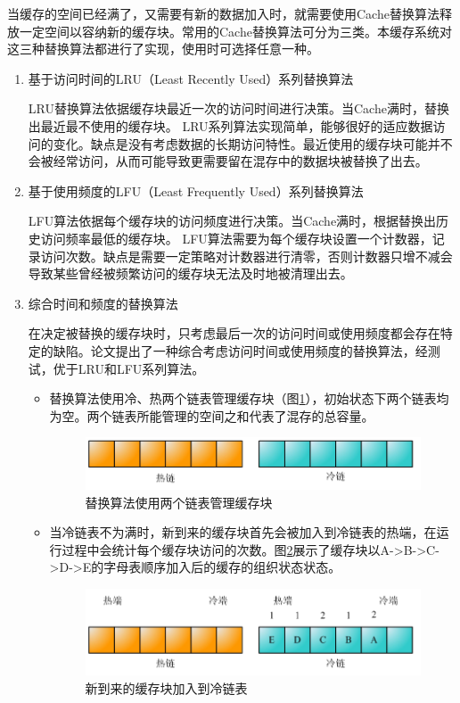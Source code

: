 当缓存的空间已经满了，又需要有新的数据加入时，就需要使用Cache替换算法释放一定空间以容纳新的缓存块。常用的Cache替换算法可分为三类。本缓存系统对这三种替换算法都进行了实现，使用时可选择任意一种。
\begin{enumerate}

\item 基于访问时间的LRU（Least Recently Used）系列替换算法

LRU替换算法依据缓存块最近一次的访问时间进行决策。当Cache满时，替换出最近最不使用的缓存块。
LRU系列算法实现简单，能够很好的适应数据访问的变化。缺点是没有考虑数据的长期访问特性。最近使用的缓存块可能并不会被经常访问，从而可能导致更需要留在混存中的数据块被替换了出去。

\item 基于使用频度的LFU（Least Frequently Used）系列替换算法

LFU算法依据每个缓存块的访问频度进行决策。当Cache满时，根据替换出历史访问频率最低的缓存块。
LFU算法需要为每个缓存块设置一个计数器，记录访问次数。缺点是需要一定策略对计数器进行清零，否则计数器只增不减会导致某些曾经被频繁访问的缓存块无法及时地被清理出去。

\item 综合时间和频度的替换算法

在决定被替换的缓存块时，只考虑最后一次的访问时间或使用频度都会存在特定的缺陷。论文提出了一种综合考虑访问时间或使用频度的替换算法，经测试，优于LRU和LFU系列算法。
\begin{itemize}
\item
替换算法使用冷、热两个链表管理缓存块（图\ref{fig:replace-algo-1}），初始状态下两个链表均为空。两个链表所能管理的空间之和代表了混存的总容量。
\begin{figure}[H]
\centering
\includegraphics[width=0.6\linewidth]{./graph/replace-algo-1}
\caption{替换算法使用两个链表管理缓存块}
\label{fig:replace-algo-1}
\end{figure}

\item
当冷链表不为满时，新到来的缓存块首先会被加入到冷链表的热端，在运行过程中会统计每个缓存块访问的次数。图\ref{fig:replace-algo-2}展示了缓存块以A->B->C->D->E的字母表顺序加入后的缓存的组织状态状态。
\begin{figure}[H]
\centering
\includegraphics[width=0.6\linewidth]{./graph/replace-algo-2}
\caption{新到来的缓存块加入到冷链表}
\label{fig:replace-algo-2}
\end{figure}


\end{itemize}
\end{enumerate}
